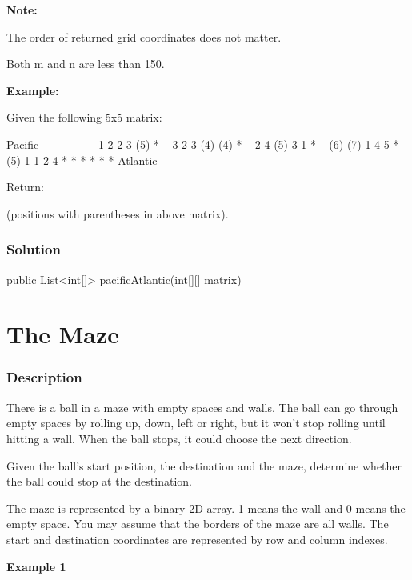 \textbf{Note:}

The order of returned grid coordinates does not matter.

Both m and n are less than 150.

\textbf{Example:}

Given the following 5x5 matrix:
\begin{Code}
  Pacific ~   ~   ~   ~   ~
       ~  1   2   2   3  (5) *
       ~  3   2   3  (4) (4) *
       ~  2   4  (5)  3   1  *
       ~ (6) (7)  1   4   5  *
       ~ (5)  1   1   2   4  *
          *   *   *   *   * Atlantic
\end{Code}

Return:

\code{[[0, 4], [1, 3], [1, 4], [2, 2], [3, 0], [3, 1], [4, 0]]} (positions with parentheses in above matrix).

\subsubsection{Solution}

\begin{Code}
public List<int[]> pacificAtlantic(int[][] matrix) {

}
\end{Code}

\newpage

\section{The Maze} %

\subsubsection{Description}

There is a ball in a maze with empty spaces and walls. The ball can go through empty spaces by rolling up, down, left or right, but it won't stop rolling until hitting a wall. When the ball stops, it could choose the next direction.

Given the ball's start position, the destination and the maze, determine whether the ball could stop at the destination.

The maze is represented by a binary 2D array. 1 means the wall and 0 means the empty space. You may assume that the borders of the maze are all walls. The start and destination coordinates are represented by row and column indexes.

\textbf{Example 1}

